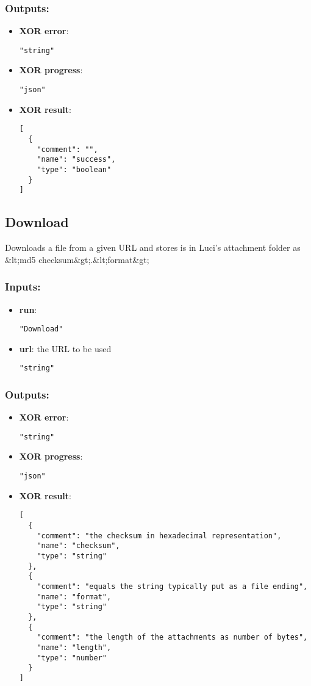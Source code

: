 \subsubsection*{Outputs:}
\begin{itemize}
    \item \textbf{XOR error}: 
\begin{lstlisting}
"string"
\end{lstlisting}
    \item \textbf{XOR progress}: 
\begin{lstlisting}
"json"
\end{lstlisting}
    \item \textbf{XOR result}: 
\begin{lstlisting}
[
  {
    "comment": "", 
    "name": "success", 
    "type": "boolean"
  }
]
\end{lstlisting}
  \end{itemize}

\subsection{Download}
Downloads
 a file from a given URL and stores is in Luci's attachment folder as 
\&lt;md5 checksum\&gt;.\&lt;format\&gt; 
\subsubsection*{Inputs:}
\begin{itemize}
    \item \textbf{run}: 
\begin{lstlisting}
"Download"
\end{lstlisting}
    \item \textbf{url}: the URL to be used
\begin{lstlisting}
"string"
\end{lstlisting}
  \end{itemize}

\subsubsection*{Outputs:}
\begin{itemize}
    \item \textbf{XOR error}: 
\begin{lstlisting}
"string"
\end{lstlisting}
    \item \textbf{XOR progress}: 
\begin{lstlisting}
"json"
\end{lstlisting}
    \item \textbf{XOR result}: 
\begin{lstlisting}
[
  {
    "comment": "the checksum in hexadecimal representation", 
    "name": "checksum", 
    "type": "string"
  }, 
  {
    "comment": "equals the string typically put as a file ending", 
    "name": "format", 
    "type": "string"
  }, 
  {
    "comment": "the length of the attachments as number of bytes", 
    "name": "length", 
    "type": "number"
  }
]
\end{lstlisting}
  \end{itemize}


